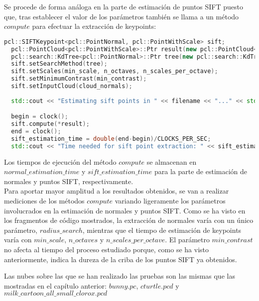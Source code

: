 Se procede de forma análoga en la parte de estimación de puntos SIFT puesto que, tras establecer el valor de los parámetros también se llama a un método $compute$ para efectuar la extracción de keypoints:

\begin{lstlisting}[language=C++,breaklines]
  pcl::SIFTKeypoint<pcl::PointNormal, pcl::PointWithScale> sift;
  pcl::PointCloud<pcl::PointWithScale>::Ptr result(new pcl::PointCloud<pcl::PointWithScale>);
  pcl::search::KdTree<pcl::PointNormal>::Ptr tree(new pcl::search::KdTree<pcl::PointNormal> ());
  sift.setSearchMethod(tree);
  sift.setScales(min_scale, n_octaves, n_scales_per_octave);
  sift.setMinimumContrast(min_contrast);
  sift.setInputCloud(cloud_normals);
 
  std::cout << "Estimating sift points in " << filename << "..." << std::endl;

  begin = clock();
  sift.compute(*result);
  end = clock();
  sift_estimation_time = double(end-begin)/CLOCKS_PER_SEC;
  std::cout << "Time needed for sift point extraction: " << sift_estimation_time << " seconds" << std::endl << std::endl;
\end{lstlisting}

Los tiempos de ejecución del método $compute$ se almacenan en $normal\_estimation\_time$ y $sift\_estimation\_time$ para la parte de estimación de normales y puntos SIFT, respectivamente.
\\
Para aportar mayor amplitud a los resultados obtenidos, se van a realizar mediciones de los métodos $compute$ variando ligeramente los parámetros involucrados en la estimación de normales y puntos SIFT. Como se ha visto en los fragmentos de código mostrados, la extracción de normales varía con un único parámetro, $radius\_search$, mientras que el tiempo de estimación de keypoints varía con $min\_scale$, $n\_octaves$ y $n\_scales\_per\_octave$. El parámetro $min\_contrast$ no afecta al tiempo del proceso estudiado porque, como se ha visto anteriormente, indica la dureza de la criba de los puntos SIFT ya obtenidos.

Las nubes sobre las que se han realizado las pruebas son las mismas que las mostradas en el capítulo anterior: $bunny.pc$, $cturtle.pcd$ y $milk\_cartoon\_all\_small\_clorox.pcd$


